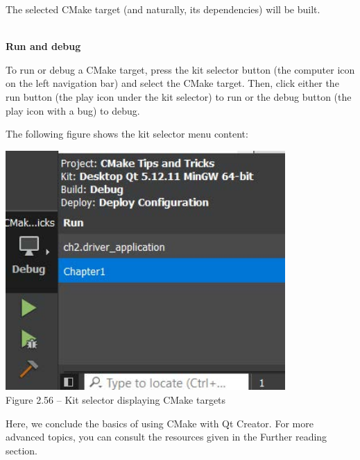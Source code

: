 The selected CMake target (and naturally, its dependencies) will be built.

\hspace*{\fill} \\ %
\noindent
\textbf{Run and debug}

To run or debug a CMake target, press the kit selector button (the computer icon on the left navigation bar) and select the CMake target. Then, click either the run button (the play icon under the kit selector) to run or the debug button (the play icon with a bug) to debug.

The following figure shows the kit selector menu content:

\begin{center}
\includegraphics[width=0.8\textwidth]{content/1/chapter2/images/56.jpg}\\
Figure 2.56 – Kit selector displaying CMake targets
\end{center}

Here, we conclude the basics of using CMake with Qt Creator. For more advanced topics, you can consult the resources given in the Further reading section.

















